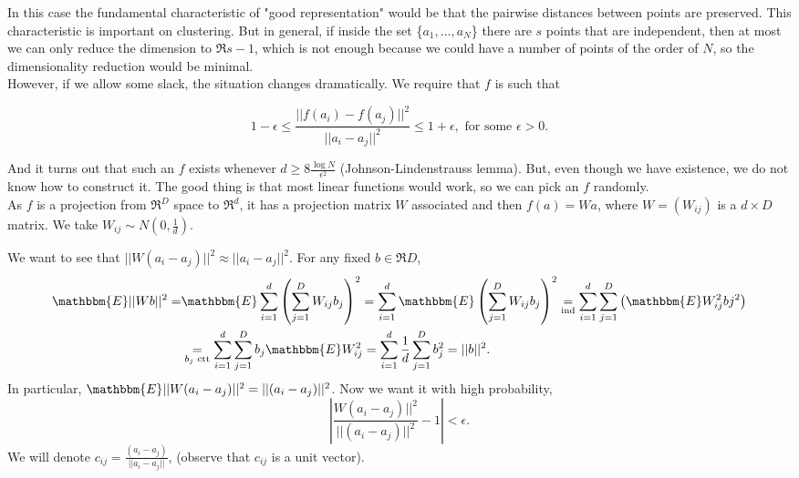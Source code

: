 \documentclass[11pt, english]{article}
\begin{document}
In this case the fundamental characteristic of "good representation" would be that the pairwise distances between points are preserved. This characteristic is important on clustering. But in general, if inside the set \{$a_1,\dots,a_N$\} there are $s$ points that are independent, then at most we can only reduce the dimension to $\Re{s-1}$, which is not enough because we could have a number of points of the order of $N$, so the dimensionality reduction would be minimal.\\

However, if we allow some slack, the situation changes dramatically. We require that $f$ is such that

\begin{equation}
	1-\epsilon\leq\frac{||f(a_i)-f(a_j)||^2}{||a_i-a_j||^2}\leq 1+\epsilon, \text{ for some }\epsilon>0. 
\end{equation}

And it turns out that such an $f$ exists whenever $d\geq 8\frac{\log N}{\epsilon^2}$ (Johnson-Lindenstrauss lemma). But, even though we have existence, we do not know how to construct it. The good thing is that most linear functions would work, so we can pick an $f$ randomly. \\

As $f$ is a projection from $\Re^D$ space to $\Re^d$, it has a projection matrix $W$ associated and then $f(a)=Wa$, where $W=(W_{ij})$ is a $d\times D$ matrix. We take $W_{ij}\sim N(0,\frac{1}{d})$.

We want to see that $||W(a_i-a_j)||^2\approx ||a_i-a_j||^2$. For any fixed $b\in \Re{D}$, 
\begin{align}
	\mathbbm{E}||Wb||^2= & \mathbbm{E}\sum\limits_{i=1}^d\left(\sum\limits_{j=1}^D W_{ij}b_j\right)^2=\sum\limits_{i=1}^d\mathbbm{E}\left(\sum\limits_{j=1}^DW_{ij}b_j\right)^2  \underset{\text{ind}}{=}\sum\limits_{i=1}^d\sum\limits_{j=1}^D\left(\mathbbm{E}W_{ij}^2bj^2\right)\\
	& \underset{b_j\text{ ctt}}{=}\sum\limits_{i=1}^d\sum\limits_{j=1}^Db_j\mathbbm{E}W_{ij}^2=\sum_{i=1}^d\frac{1}{d}\sum\limits_{j=1}^Db_j^2=||b||^2.
\end{align}
In particular, $\mathbbm{E}||W(a_i-a_j)||^2=||(a_i-a_j)||^2$. Now we want it with high probability,
\begin{equation}
	\left\lvert\frac{W(a_i-a_j)||^2}{||(a_i-a_j)||^2}-1\right\lvert<\epsilon.
\end{equation}
We will denote $c_{ij}=\frac{(a_i-a_j)}{||a_i-a_j||}$, (observe that $c_{ij}$ is a unit vector).
	
\end{document}
